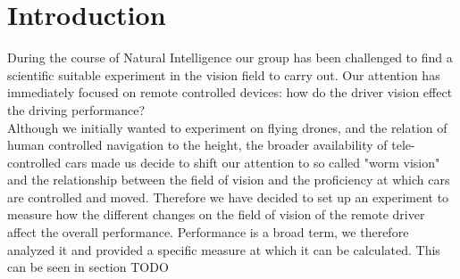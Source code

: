 \chapter{Introduction}
During the course of Natural Intelligence our group has been challenged to find a scientific suitable experiment in the vision field to carry out. 
Our attention has immediately focused on remote controlled devices: how do the driver vision effect the driving performance? \\
 Although we initially wanted to experiment on flying drones, and the relation of human controlled navigation to the height, the broader availability of tele-controlled cars made us decide to shift our attention to so called "worm vision" and the relationship between the field of vision and the proficiency at which cars are controlled and moved.
 Therefore we have decided to set up an experiment to measure how the different changes on the field of vision of the remote driver affect the overall performance. 
 Performance is a broad term, we therefore analyzed it and provided a specific measure at which it can be calculated. This can be seen in section TODO
